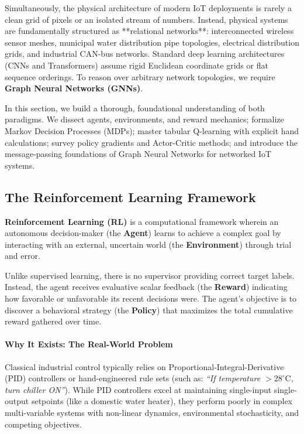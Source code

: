 Simultaneously, the physical architecture of modern IoT deployments is rarely a clean grid of pixels or an isolated stream of numbers. Instead, physical systems are fundamentally structured as **relational networks**: interconnected wireless sensor meshes, municipal water distribution pipe topologies, electrical distribution grids, and industrial CAN-bus networks. Standard deep learning architectures (CNNs and Transformers) assume rigid Euclidean coordinate grids or flat sequence orderings. To reason over arbitrary network topologies, we require \textbf{Graph Neural Networks (GNNs)}.

In this section, we build a thorough, foundational understanding of both paradigms. We dissect agents, environments, and reward mechanics; formalize Markov Decision Processes (MDPs); master tabular Q-learning with explicit hand calculations; survey policy gradients and Actor-Critic methods; and introduce the message-passing foundations of Graph Neural Networks for networked IoT systems.

\subsection{The Reinforcement Learning Framework}\label{subsec:rl_framework}

\begin{keyidea}
\textbf{Reinforcement Learning (RL)} is a computational framework wherein an autonomous decision-maker (the \textbf{Agent}) learns to achieve a complex goal by interacting with an external, uncertain world (the \textbf{Environment}) through trial and error.

Unlike supervised learning, there is no supervisor providing correct target labels. Instead, the agent receives evaluative scalar feedback (the \textbf{Reward}) indicating how favorable or unfavorable its recent decisions were. The agent's objective is to discover a behavioral strategy (the \textbf{Policy}) that maximizes the total cumulative reward gathered over time.
\end{keyidea}

\paragraph{Why It Exists: The Real-World Problem}
Classical industrial control typically relies on Proportional-Integral-Derivative (PID) controllers or hand-engineered rule sets (such as: \emph{``If temperature $> 28^\circ\text{C}$, turn chiller ON''}). While PID controllers excel at maintaining single-input single-output setpoints (like a domestic water heater), they perform poorly in complex multi-variable systems with non-linear dynamics, environmental stochasticity, and competing objectives.

